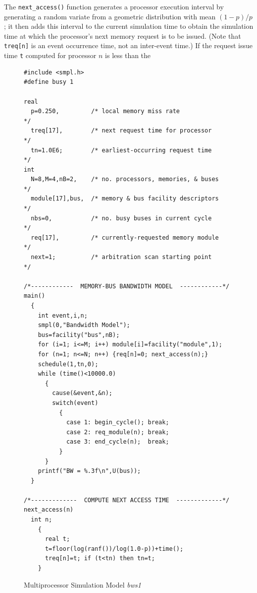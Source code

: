 The \texttt{next\_access()} function generates a processor execution interval by
generating a random variate from a geometric distribution with mean
$(1-p)/p$; it then adds this interval to the current simulation time to obtain
the simulation time at which the processor's next memory request is to be
issued. (Note that \texttt{treq[n]} is an event occurrence time, not an inter-event
time.) If the request issue time \texttt{t} computed for processor $n$ is less than the
\begin{figure}[H]
\centering
\begin{minipage}{.98\textwidth}
\begin{lstlisting}[basicstyle=\ttfamily\scriptsize]
#include <smpl.h>
#define busy 1

real
  p=0.250,         /* local memory miss rate                */
  treq[17],        /* next request time for processor       */
  tn=1.0E6;        /* earliest-occurring request time       */
int
  N=8,M=4,nB=2,    /* no. processors, memories, & buses     */
  module[17],bus,  /* memory & bus facility descriptors     */
  nbs=0,           /* no. busy buses in current cycle       */
  req[17],         /* currently-requested memory module     */
  next=1;          /* arbitration scan starting point       */

/*------------  MEMORY-BUS BANDWIDTH MODEL  ------------*/
main()
  {
    int event,i,n;
    smpl(0,"Bandwidth Model");
    bus=facility("bus",nB);
    for (i=1; i<=M; i++) module[i]=facility("module",1);
    for (n=1; n<=N; n++) {req[n]=0; next_access(n);}
    schedule(1,tn,0);
    while (time()<10000.0)
      {
        cause(&event,&n);
        switch(event)
          {
            case 1: begin_cycle(); break;
            case 2: req_module(n); break;
            case 3: end_cycle(n);  break;
          }
      }
    printf("BW = %.3f\n",U(bus));
  }

/*-------------  COMPUTE NEXT ACCESS TIME  -------------*/
next_access(n)
  int n;
    {
      real t;
      t=floor(log(ranf())/log(1.0-p))+time();
      treq[n]=t; if (t<tn) then tn=t;
    }
\end{lstlisting}
\end{minipage}
\caption{Multiprocessor Simulation Model \emph{bws1}}
\end{figure}
\addtocounter{figure}{-1}
